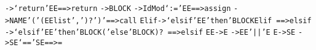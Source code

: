 {{{{\texttt{\small \phantom{ }-\textgreater \phantom{ }‘return’\phantom{ }EE\phantom{ }\phantom{ }\phantom{ }\phantom{ }\phantom{ }\phantom{ }\phantom{ }\phantom{ }\phantom{ }\phantom{ }\phantom{ }\phantom{ }\phantom{ }\phantom{ }\phantom{ }\phantom{ }\phantom{ }\phantom{ }\phantom{ }\phantom{ }==\textgreater \phantom{ }return}\mbox{}\newline
\texttt{\small \phantom{ }-\textgreater \phantom{ }BLOCK}\mbox{}\newline
\texttt{\small \phantom{ }-\textgreater \phantom{ }IdMod‘:=’\phantom{ }EE\phantom{ }\phantom{ }\phantom{ }\phantom{ }\phantom{ }\phantom{ }\phantom{ }\phantom{ }\phantom{ }\phantom{ }\phantom{ }\phantom{ }\phantom{ }\phantom{ }\phantom{ }\phantom{ }\phantom{ }\phantom{ }\phantom{ }\phantom{ }==\textgreater \phantom{ }assign}\mbox{}\newline
\texttt{\small \phantom{ }-\textgreater \phantom{ }NAME\phantom{ }'('\phantom{ }(EE\phantom{ }list\phantom{ }',')?\phantom{ }')'\phantom{ }==\textgreater \phantom{ }call}\mbox{}\newline
\texttt{\small }\mbox{}\newline
\texttt{\small \phantom{ }Elif\phantom{ }-\textgreater \phantom{ }‘elsif’\phantom{ }EE\phantom{ }'then'\phantom{ }BLOCK\phantom{ }Elif	\phantom{ }\phantom{ }\phantom{ }\phantom{ }\phantom{ }\phantom{ }\phantom{ }\phantom{ }\phantom{ }\phantom{ }\phantom{ }\phantom{ }\phantom{ }\phantom{ }\phantom{ }\phantom{ }==\textgreater \phantom{ }elsif}\mbox{}\newline
\texttt{\small \phantom{ }\phantom{ }\phantom{ }\phantom{ }\phantom{ }\phantom{ }-\textgreater \phantom{ }‘elsif’\phantom{ }EE\phantom{ }'then'\phantom{ }BLOCK\phantom{ }('else'\phantom{ }BLOCK)?	==\textgreater \phantom{ }elsif}\mbox{}\newline
\texttt{\small \phantom{ }}\mbox{}\newline
\texttt{\small \phantom{ }EE\phantom{ }-\textgreater \phantom{ }E}\mbox{}\newline
\texttt{\small \phantom{ }-\textgreater \phantom{ }EE\phantom{ }'||'\phantom{ }E}\mbox{}\newline
\texttt{\small \phantom{ }}\mbox{}\newline
\texttt{\small \phantom{ }E\phantom{ }-\textgreater \phantom{ }SE}\mbox{}\newline
\texttt{\small \phantom{ }-\textgreater \phantom{ }SE\phantom{ }‘==’\phantom{ }SE\phantom{ }\phantom{ }\phantom{ }==\textgreater \phantom{ }=}\mbox{}\newline
}}}}
